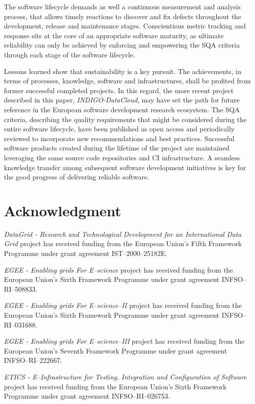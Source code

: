 \documentclass[journal]{IEEEtran}
\begin{document}
The software lifecycle demands as well a continuous measurement and analysis
process, that allows timely reactions to discover and fix defects throughout the
development, release and maintenance stages. Conscientious metric
tracking and response sits at the core of an appropriate software maturity, as
ultimate reliability can only be achieved by enforcing and empowering the SQA
criteria through each stage of the software lifecycle.

Lessons learned show that sustainability is a key pursuit. The achievements, in terms of
processes, knowledge, software and infrastructures, shall be profited from former successful 
completed projects. In this regard, the more recent project described in this paper, {\sl INDIGO-DataCloud},
may have set the path for future reference in the European software development research ecosystem.
The SQA criteria, describing the quality requirements that might be considered during the entire
software lifecycle, have been published as open access and periodically reviewed to incorporate
new recommendations and best practices. Successful software products created during the lifetime of the 
project are maintained leveraging the same source code repositories and CI infrastructure. A seamless 
knowledge transfer among subsequent software development initiatives is key for the good progress of
delivering reliable software.


\section*{Acknowledgment}

{\sl DataGrid - Research and Technological Development for an International Data Grid}
project has received funding from the European Union's Fifth Framework Programme under
grant agreement IST--2000--25182E.

{\sl EGEE - Enabling grids For E--science} project has received funding from the European
Union's Sixth Framework Programme under grant agreement INFSO--RI--508833.

{\sl EGEE - Enabling grids For E--science--II} project has received funding from the
European Union's Sixth Framework Programme under grant agreement INFSO--RI--031688.

{\sl EGEE - Enabling grids For E--science--III} project has received funding from the
European Union's Seventh Framework Programme under grant agreement INFSO--RI--222667.

{\sl ETICS - E--Infrastructure for Testing, Integration and Configuration of Software}
project has received funding from the European Union's Sixth Framework Programme under
grant agreement INFSO--RI--026753.
\end{document}
